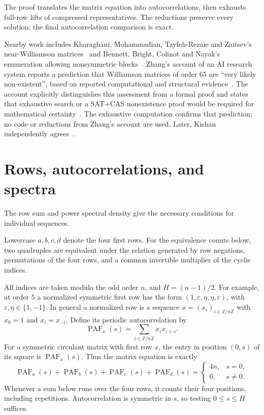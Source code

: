 \documentclass[11pt]{article}
\newcommand{\PAF}{\operatorname{PAF}}
\newcommand{\Z}{\mathbb Z}
\begin{document}
The proof translates the matrix equation into autocorrelations, then
exhausts full-row lifts of compressed representatives. The reductions
preserve every solution; the final autocorrelation comparison is exact.

Nearby work includes Kharaghani, Mohammadian, Tayfeh-Rezaie and Zaitsev's
near-Williamson matrices~\cite[Definition 1.1, Table 6]{KMTZ} and
Bennett, Bright, Colinot and Nayak's enumeration allowing nonsymmetric
blocks~\cite[abstract]{BBCN}. Zhang's account of an AI research system reports a prediction that Williamson
matrices of order $65$ are ``very likely non-existent'', based on reported
computational and structural evidence~\cite[\S7.4]{Zhang}.
The account explicitly distinguishes this assessment from a formal proof
and states that exhaustive search or a SAT+CAS nonexistence proof would be
required for mathematical certainty~\cite[\S7.5]{Zhang}.
The exhaustive computation confirms that prediction;
no code or reductions from Zhang's account are used.
Later, Kishan independently agrees~\cite[\S101]{Kishan}.

\section{Rows, autocorrelations, and spectra}\label{sec:rows}
The row sum and power spectral density give the necessary conditions for
individual sequences.

Lowercase $a,b,c,d$ denote the four first rows. For the equivalence counts
below, two quadruples are equivalent under the relation generated by row
negations, permutations of the four rows, and a common invertible
multiplier of the cyclic indices.

All indices are taken modulo the odd order $n$, and $H=(n-1)/2$.
For example, at order $5$ a normalized symmetric first row has the form
$(1,\varepsilon,\eta,\eta,\varepsilon)$, with
$\varepsilon,\eta\in\{1,-1\}$. In general a normalized row is a
sequence $x=(x_i)_{i\in\Z/n\Z}$ with $x_0=1$ and $x_i=x_{-i}$.
Define its periodic autocorrelation by
\[
 \PAF_x(s)=\sum_{i\in\Z/n\Z}x_i x_{i+s}.
\]
For a symmetric circulant matrix with first row $x$, the entry in
position $(0,s)$ of its square is $\PAF_x(s)$. Thus the matrix equation is
exactly
\begin{equation}\label{eq:paf}
 \PAF_a(s)+\PAF_b(s)+\PAF_c(s)+\PAF_d(s)
 =\begin{cases}4n,&s=0,\\0,&s\ne0.\end{cases}
\end{equation}
Whenever a sum below runs over the four rows, it counts their four positions,
including repetitions. Autocorrelation is symmetric in $s$, so testing $0\leq s\leq H$ suffices.
\end{document}
